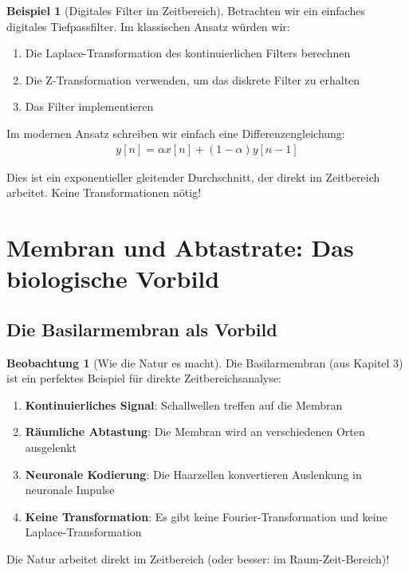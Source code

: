 ﻿\documentclass[a4paper,12pt]{report}
\theoremstyle{definition}
\newtheorem{beispiel}{Beispiel}
\newtheorem{beobachtung}{Beobachtung}
\begin{document}
	\begin{beispiel}[Digitales Filter im Zeitbereich]
		
		Betrachten wir ein einfaches digitales Tiefpassfilter. Im klassischen Ansatz würden wir:
		\begin{enumerate}
			\item[-] Die Laplace-Transformation des kontinuierlichen Filters berechnen
			\item[-] Die Z-Transformation verwenden, um das diskrete Filter zu erhalten
			\item[-] Das Filter implementieren
		\end{enumerate}
		
		Im modernen Ansatz schreiben wir einfach eine Differenzengleichung:
		\begin{align}
			y[n] = \alpha x[n] + (1 - \alpha) y[n-1]
		\end{align}
		
		Dies ist ein exponentieller gleitender Durchschnitt, der direkt im Zeitbereich arbeitet. Keine Transformationen nötig!
	\end{beispiel}
	
	\section{Membran und Abtastrate: Das biologische Vorbild}
	
	\subsection{Die Basilarmembran als Vorbild}
	
	\begin{beobachtung}[Wie die Natur es macht]
		
		Die Basilarmembran (aus Kapitel 3) ist ein perfektes Beispiel für direkte Zeitbereichsanalyse:
		
		\begin{enumerate}
			\item[-] \textbf{Kontinuierliches Signal}: Schallwellen treffen auf die Membran
			\item[-] \textbf{Räumliche Abtastung}: Die Membran wird an verschiedenen Orten ausgelenkt
			\item[-] \textbf{Neuronale Kodierung}: Die Haarzellen konvertieren Auslenkung in neuronale Impulse
			\item[-] \textbf{Keine Transformation}: Es gibt keine Fourier-Transformation und keine Laplace-Trans\-for\-mation
		\end{enumerate}
		
		Die Natur arbeitet direkt im Zeitbereich (oder besser: im Raum-Zeit-Bereich)!
	\end{beobachtung}
	
\end{document}
